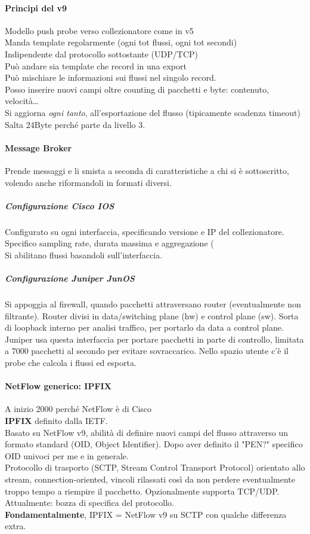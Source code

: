 \documentclass[10pt]{book}
\begin{document}
\paragraph{Principi del v9} Modello push probe verso collezionatore come in v5\\
Manda template regolarmente (ogni tot flussi, ogni tot secondi)\\
Indipendente dal protocollo sottostante (UDP/TCP)\\
Può andare sia template che record in una export\\
Può mischiare le informazioni sui flussi nel singolo record.\\
Posso inserire nuovi campi oltre counting di pacchetti e byte: contenuto, velocità\ldots\\
Si aggiorna \textit{ogni tanto}, all'esportazione del flusso (tipicamente scadenza timeout)\\
Salta 24Byte perché parte da livello 3.
\paragraph{Message Broker} Prende messaggi e li smista a seconda di caratteristiche a chi si è sottoscritto, volendo anche riformandoli in formati diversi.
\subparagraph{Configurazione Cisco IOS} Configurato su ogni interfaccia, specificando versione e IP del collezionatore. Specifico sampling rate, durata massima e aggregazione (\\
Si abilitano flussi basandoli sull'interfaccia.
\subparagraph{Configurazione Juniper JunOS} Si appoggia al firewall, quando pacchetti attraversano router (eventualmente non filtrante). Router divisi in data/switching plane (hw) e control plane (sw). Sorta di loopback interno per analisi traffico, per portarlo da data a control plane. Juniper usa questa interfaccia per portare pacchetti in parte di controllo, limitata a 7000 pacchetti al secondo per evitare sovraccarico. Nello spazio utente c'è il probe che calcola i flussi ed esporta.
\paragraph{NetFlow generico: IPFIX} A inizio 2000 perché NetFlow è di Cisco\\
\textbf{IPFIX} definito dalla IETF.\\
Basato su NetFlow v9, abilità di definire nuovi campi del flusso attraverso un formato standard (OID, Object Identifier). Dopo aver definito il "PEN?" specifico OID univoci per me e in generale.\\
Protocollo di trasporto (SCTP, Stream Control Transport Protocol) orientato allo stream, connection-oriented, vincoli rilassati così da non perdere eventualmente troppo tempo a riempire il pacchetto. Opzionalmente supporta TCP/UDP.\\
Attualmente: bozza di specifica del protocollo.\\
\textbf{Fondamentalmente}, IPFIX = NetFlow v9 su SCTP con qualche differenza extra.
\end{document}

